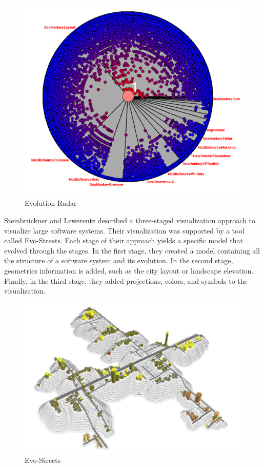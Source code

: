 \begin{figure}[H]
  \includegraphics[width=\linewidth]{DAmbros2006a_EvoRadar.png}
  \caption{Evolution Radar}
  \label{fig:Evoradar}
\endminipage\hfill
  \end{figure}
  
Steinbrückner and Lewerentz \cite{Steinbrueckner2010} described a three-staged visualization approach to visualize large software systems. 
Their visualization was supported by a tool called Evo-Streets. 
Each stage of their approach yields a specific model that evolved through the stages. In the first stage, they created a model containing all the structure of a software system and its evolution. In the second stage, geometrics information is added, such as the city layout or landscape elevation. Finally, in the third stage, they added projections, colors, and symbols to the visualization. 

\begin{figure}[ht]
\centering
  \includegraphics[width=0.9\linewidth]{Steinbrueckner2010.png} 
  \caption{Evo-Streets}
\end{figure}
 
